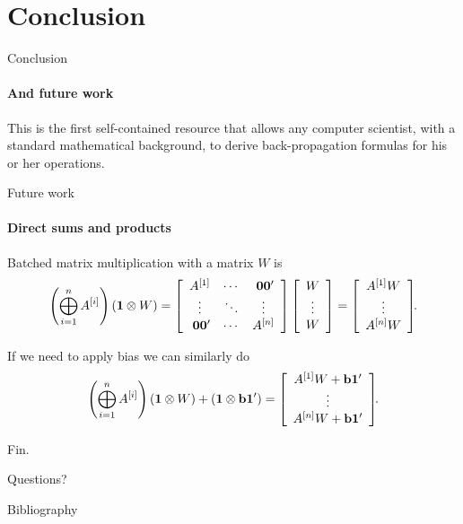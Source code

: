 \documentclass[noamsthm]{beamer}
\begin{document}
\section{Conclusion}

\begin{frame}{Conclusion}
\framesubtitle{And future work}
This is the first self-contained resource that allows any computer scientist,
with a standard mathematical background, to derive back-propagation formulas for
his or her operations.
\end{frame}

\begin{frame}{Future work}
\framesubtitle{Direct sums and products}
\newcommand{\Z}{\phantom{{}'}\vec 0 \vec 0'}

Batched matrix multiplication with a matrix \(W\) is \[
\left(\bigoplus_{i=1}^n A^{[i]}\right) (\vec 1 \krone W)
= \left[\begin{array}{ccc}
    A^{[1]} & \cdots & \Z \\
    \vdots & \ddots & \vdots \\
    \Z & \cdots & A^{[n]}
\end{array}\right]
\left[\begin{array}{c}W \\ \vdots \\ W \end{array}\right]
= \left[\begin{array}{c}A^{[1]} W \\ \vdots \\ A^{[n]} W\end{array}\right]\!\!.\]

If we need to apply bias we can similarly do \[
\left(\bigoplus_{i=1}^n A^{[i]}\right) (\mathbf{1} \otimes W)
+ (\mathbf{1} \otimes \mathbf{b} \mathbf{1}')
= \left[\begin{array}{c}
    A^{[1]} W + \mathbf{b} \mathbf{1}' \\ \vdots \\ A^{[n]} W + \mathbf{b} \mathbf{1}'
\end{array}\right]\!\!.
\]
\end{frame}


\begin{frame}
\centering
\LARGE Fin.

\footnotesize Questions?
\end{frame}

\begin{frame}{Bibliography}


\end{frame}
\end{document}
